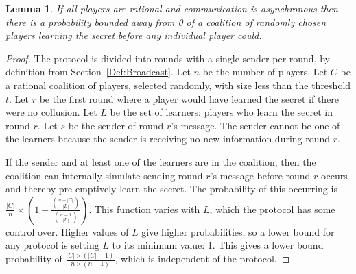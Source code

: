 \documentclass{dalcsthesis}
\newtheorem{lemma}{Lemma}
\begin{document}
\begin{lemma}\label{Lem:Async:CoalitionsMayPreempt}If all players are rational and communication is asynchronous then there is a probability bounded away from 0 of a coalition of randomly chosen players learning the secret before any individual player could.\end{lemma}
\begin{proof}
The protocol is divided into rounds with a single sender per round, by definition from Section~\ref{Def:Broadcast}. 
Let $n$ be the number of players.
Let $C$ be a rational coalition of players, selected randomly, with size less than the threshold $t$.
Let $r$ be the first round where a player would have learned the secret if there were no collusion.
Let $L$ be the set of learners: players who learn the secret in round $r$.
Let $s$ be the sender of round $r$'s message.
The sender cannot be one of the learners because the sender is receiving no new information during round $r$.

If the sender and at least one of the learners are in the coalition, then the coalition can internally simulate sending round $r$'s message before round $r$ occurs and thereby pre-emptively learn the secret. The probability of this occurring is $\frac{|C|}{n} \times \left(1 - \frac{\binom{n - |C|}{|L|}}{\binom{n - 1}{|L|}}\right)$. This function varies with $L$, which the protocol has some control over. Higher values of $L$ give higher probabilities, so a lower bound for any protocol is setting $L$ to its minimum value: 1. This gives a lower bound probability of $\frac{|C| \times (|C| - 1)}{n \times (n-1)}$, which is independent of the protocol.
\end{proof}
\end{document}
